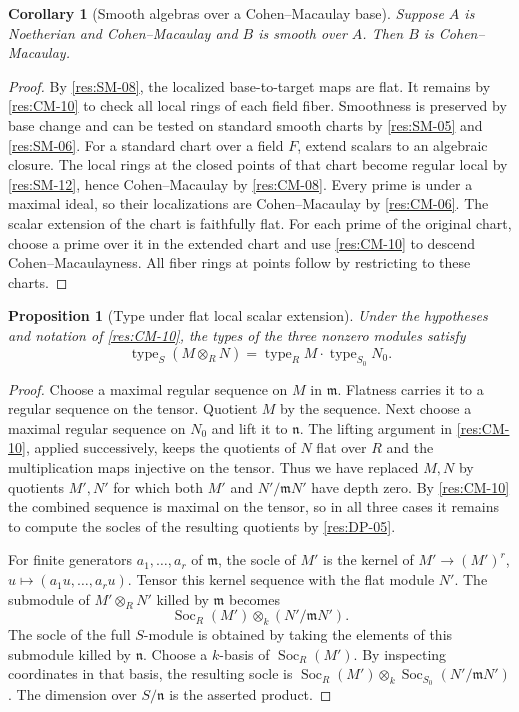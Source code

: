 \documentclass[11pt,oneside,openany]{book}
\newtheorem{proposition}[theorem]{Proposition}
\newtheorem{corollary}[theorem]{Corollary}
\theoremstyle{definition}
\theoremstyle{remark}
\begin{document}
\begin{corollary}[Smooth algebras over a Cohen--Macaulay base]
\label{res:CM-17}
Suppose $A$ is Noetherian and Cohen--Macaulay and $B$ is
smooth over $A$. Then $B$ is Cohen--Macaulay.
\end{corollary}
\begin{proof}
By \ref{res:SM-08}, the localized base-to-target maps are
flat. It remains by \ref{res:CM-10} to check all local
rings of each field fiber. Smoothness is preserved by
base change and can be tested on standard smooth charts
by \ref{res:SM-05} and \ref{res:SM-06}. For a standard chart
over a field $F$, extend scalars to an algebraic closure.
The local rings at the closed points of that chart become
regular local by \ref{res:SM-12}, hence Cohen--Macaulay
by \ref{res:CM-08}. Every prime is under a maximal ideal,
so their localizations are Cohen--Macaulay by \ref{res:CM-06}.
The scalar extension of the chart is faithfully flat.
For each prime of the original chart, choose a prime over
it in the extended chart and use \ref{res:CM-10} to descend
Cohen--Macaulayness. All fiber rings at points follow by
restricting to these charts.
\end{proof}

\begin{proposition}[Type under flat local scalar extension]\label{res:CM-18}
Under the hypotheses and notation of \ref{res:CM-10}, the
types of the three nonzero modules satisfy
\[
 \operatorname{type}_S(M\otimes_R N)
  =\operatorname{type}_R M\cdot\operatorname{type}_{S_0} N_0 .
\]
\end{proposition}
\begin{proof}
Choose a maximal regular sequence on $M$ in $\mathfrak m$.
Flatness carries it to a regular sequence on the tensor.
Quotient $M$ by the sequence. Next choose a maximal regular
sequence on $N_0$ and lift it to $\mathfrak n$. The lifting
argument in \ref{res:CM-10}, applied successively, keeps the
quotients of $N$ flat over $R$ and the multiplication maps
injective on the tensor. Thus we have replaced $M,N$ by
quotients $M',N'$ for which both $M'$ and $N'/\mathfrak m N'$
have depth zero. By \ref{res:CM-10} the combined sequence is
maximal on the tensor, so in all three cases it remains to
compute the socles of the resulting quotients by
\ref{res:DP-05}.

For finite generators $a_1,\ldots,a_r$ of $\mathfrak m$,
the socle of $M'$ is the kernel of
$M'\to (M')^r$, $u\mapsto(a_1u,\ldots,a_ru)$.
Tensor this kernel sequence with the flat module $N'$.
The submodule of $M'\otimes_R N'$ killed by $\mathfrak m$
becomes
\[
 \operatorname{Soc}_R(M')\otimes_k (N'/\mathfrak mN').
\]
The socle of the full $S$-module is obtained by taking
the elements of this submodule killed by $\mathfrak n$.
Choose a $k$-basis of $\operatorname{Soc}_R(M')$.
By inspecting coordinates in that basis, the resulting
socle is
$\operatorname{Soc}_R(M')\otimes_k
 \operatorname{Soc}_{S_0}(N'/\mathfrak mN')$.
The dimension over $S/\mathfrak n$ is the asserted product.
\end{proof}
\end{document}
